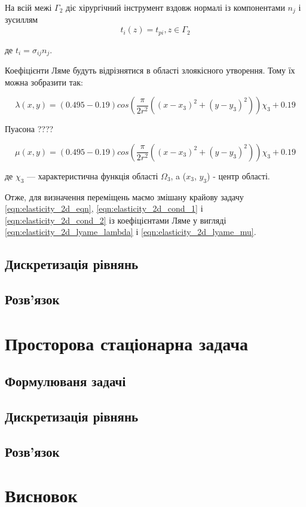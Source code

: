 \noindent На всій межі $\Gamma_2$ діє хірургічний інструмент вздовж нормалі із компонентами $n_j$ і зусиллям
\begin{equation}
    \label{eqn:elasticity_2d_cond_2}
    t_i(z) = t_{pi}, z \in \Gamma_2
\end{equation}

\noindent де $t_i = \sigma_{ij}n_j$.

Коефіцієнти Ляме будуть відрізнятися в області злоякісного утворення. Тому їх можна зобразити так:

\begin{equation}
    \label{eqn:elasticity_2d_lyame_lambda}
    \lambda(x, y) = (0.495 - 0.19)cos(\frac{\pi}{2r^2}((x - x_3)^2 + (y - y_3)^2))\chi_3 + 0.19
\end{equation}

{ Пуасона ????}

\begin{equation}
    \label{eqn:elasticity_2d_lyame_mu}
    \mu(x, y) = (0.495 - 0.19)cos(\frac{\pi}{2r^2}((x - x_3)^2 + (y - y_3)^2))\chi_3 + 0.19
\end{equation}

\noindent де $\chi_3$ --- характеристична функція області $\Omega_3$, a ($x_3$, $y_3$) - центр області.

Отже, для визначення переміщень маємо змішану крайову задачу \ref{eqn:elasticity_2d_eqn}, \ref{eqn:elasticity_2d_cond_1} 
і \ref{eqn:elasticity_2d_cond_2} із коефіцієнтами Ляме у вигляді \ref{eqn:elasticity_2d_lyame_lambda} і 
\ref{eqn:elasticity_2d_lyame_mu}.

\subsection{Дискретизація рівнянь}

\subsection{Розв'язок}

\section{Просторова стаціонарна задача}

\subsection{Формулюваня задачі}

\subsection{Дискретизація рівнянь}

\subsection{Розв'язок}

\section{Висновок}

